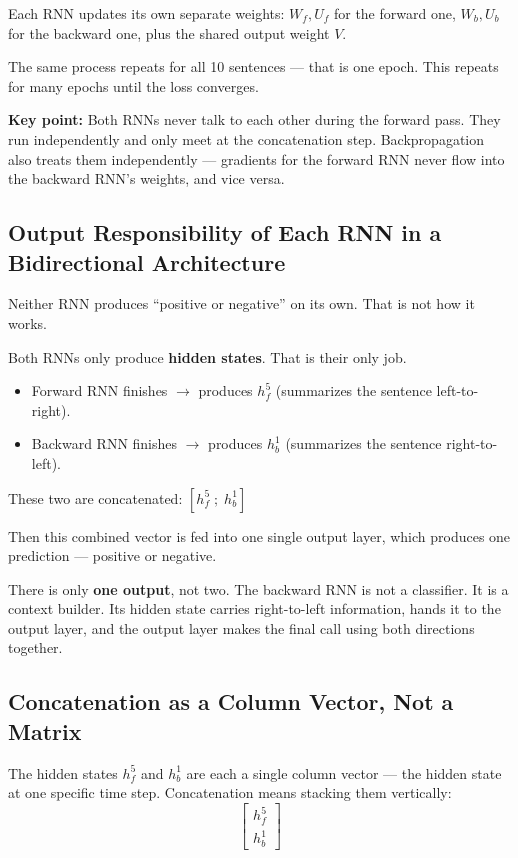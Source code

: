 Each RNN updates its own separate weights: $W_f, U_f$ for the forward one, $W_b, U_b$ for the backward one, plus the shared output weight $V$.

The same process repeats for all 10 sentences --- that is one epoch. This repeats for many epochs until the loss converges.

\textbf{Key point:} Both RNNs never talk to each other during the forward pass. They run independently and only meet at the concatenation step. Backpropagation also treats them independently --- gradients for the forward RNN never flow into the backward RNN's weights, and vice versa.


\subsection{Output Responsibility of Each RNN in a Bidirectional Architecture}

Neither RNN produces ``positive or negative'' on its own. That is not how it works.

Both RNNs only produce \textbf{hidden states}. That is their only job.

\begin{itemize}
    \item Forward RNN finishes $\rightarrow$ produces $h_f^5$ (summarizes the sentence left-to-right).
    \item Backward RNN finishes $\rightarrow$ produces $h_b^1$ (summarizes the sentence right-to-left).
\end{itemize}

These two are concatenated: $[h_f^5 \; ; \; h_b^1]$

Then this combined vector is fed into one single output layer, which produces one prediction --- positive or negative.

There is only \textbf{one output}, not two. The backward RNN is not a classifier. It is a context builder. Its hidden state carries right-to-left information, hands it to the output layer, and the output layer makes the final call using both directions together.


\subsection{Concatenation as a Column Vector, Not a Matrix}

The hidden states $h_f^5$ and $h_b^1$ are each a single column vector --- the hidden state at one specific time step. Concatenation means stacking them vertically:
\[
\begin{bmatrix} h_f^5 \\ h_b^1 \end{bmatrix}
\]

